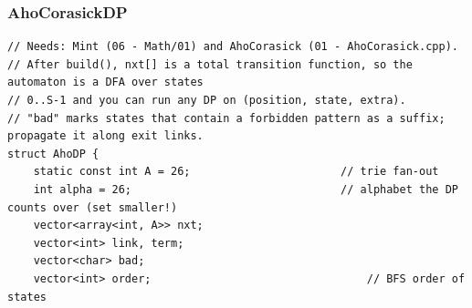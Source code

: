 \documentclass[9pt,a4paper,twocolumn]{extarticle}
\begin{document}
\subsubsection{AhoCorasickDP}
\nopagebreak
\begin{lstlisting}
// Needs: Mint (06 - Math/01) and AhoCorasick (01 - AhoCorasick.cpp).
// After build(), nxt[] is a total transition function, so the automaton is a DFA over states
// 0..S-1 and you can run any DP on (position, state, extra).
// "bad" marks states that contain a forbidden pattern as a suffix; propagate it along exit links.
struct AhoDP {
    static const int A = 26;                       // trie fan-out
    int alpha = 26;                                // alphabet the DP counts over (set smaller!)
    vector<array<int, A>> nxt;
    vector<int> link, term;
    vector<char> bad;
    vector<int> order;                                 // BFS order of states


\end{lstlisting}
\end{document}
